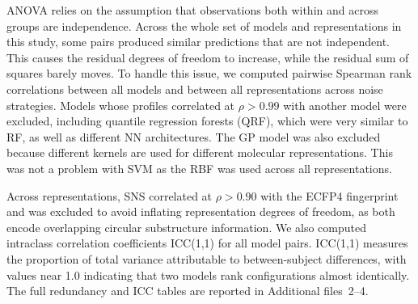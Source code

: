 \documentclass[pdflatex,sn-basic]{sn-jnl}%
\theoremstyle{thmstyleone}%
\theoremstyle{thmstyletwo}%
\theoremstyle{thmstylethree}%
\begin{document}
ANOVA relies on the assumption that observations both within and across groups are independence. Across the whole set of models and representations in this study, some pairs produced similar predictions that are not independent. This causes the residual degrees of freedom to increase, while the residual sum of squares barely moves. To handle this issue, we computed pairwise Spearman rank correlations between all models and between all representations across noise strategies. Models whose profiles correlated at $\rho > 0.99$ with another model were excluded, including quantile regression forests (QRF), which were very similar to RF, as well as different NN architectures. The GP model was also excluded because different kernels are used for different molecular representations. This was not a problem with SVM as the RBF was used across all representations. 

Across representations, SNS correlated at $\rho > 0.90$ with the ECFP4 fingerprint and was excluded to avoid inflating representation degrees of freedom, as both encode overlapping circular substructure information. We also computed intraclass correlation coefficients ICC(1,1) for all model pairs. ICC(1,1) measures the proportion of total variance attributable to between-subject differences, with values near 1.0 indicating that two models rank configurations almost identically. The full redundancy and ICC tables are reported in Additional files~2--4.
\end{document}
